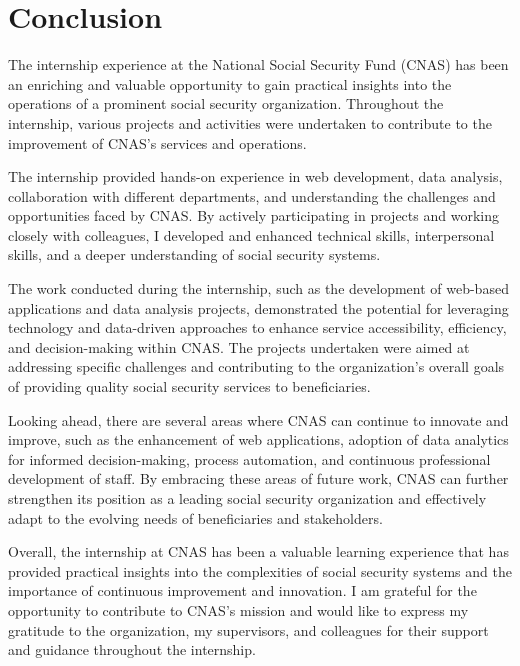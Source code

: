 \chapter*{Conclusion}
\label{chap:conclusion}

The internship experience at the National Social Security Fund (CNAS) has been an enriching and valuable opportunity to gain practical insights into the operations of a prominent social security organization. Throughout the internship, various projects and activities were undertaken to contribute to the improvement of CNAS's services and operations.

The internship provided hands-on experience in web development, data analysis, collaboration with different departments, and understanding the challenges and opportunities faced by CNAS. By actively participating in projects and working closely with colleagues, I developed and enhanced technical skills, interpersonal skills, and a deeper understanding of social security systems.

The work conducted during the internship, such as the development of web-based applications and data analysis projects, demonstrated the potential for leveraging technology and data-driven approaches to enhance service accessibility, efficiency, and decision-making within CNAS. The projects undertaken were aimed at addressing specific challenges and contributing to the organization's overall goals of providing quality social security services to beneficiaries.

Looking ahead, there are several areas where CNAS can continue to innovate and improve, such as the enhancement of web applications, adoption of data analytics for informed decision-making, process automation, and continuous professional development of staff. By embracing these areas of future work, CNAS can further strengthen its position as a leading social security organization and effectively adapt to the evolving needs of beneficiaries and stakeholders.

Overall, the internship at CNAS has been a valuable learning experience that has provided practical insights into the complexities of social security systems and the importance of continuous improvement and innovation. I am grateful for the opportunity to contribute to CNAS's mission and would like to express my gratitude to the organization, my supervisors, and colleagues for their support and guidance throughout the internship.
